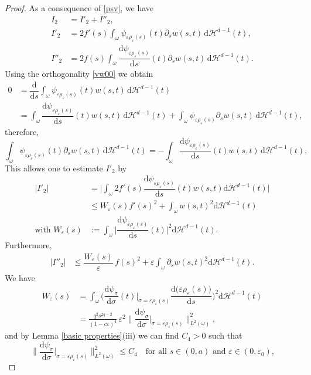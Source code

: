 \documentclass[10pt,a4paper]{amsart}
\newcommand{\dd}{\mathrm{d}}
\newcommand{\eps}{\varepsilon}
\renewcommand{\H}{\mathcal{H}}
\begin{document}
\begin{proof}
As a consequence of \eqref{psv}, we have
\begin{align*}
	I_2&=I'_2+I''_2,\\
	I'_2&=2f'(s)\int_\omega \psi_{\eps \rho_\eps(s)}(t)\partial_s w(s,t)\,\dd\H^{d-1}(t),\\
	I''_2&=2f(s)\int_\omega \dfrac{\dd\psi_{\eps \rho_\eps(s)}}{\dd s}(t)\partial_s w(s,t)\,\dd\H^{d-1}(t).
\end{align*}
Using the orthogonality \eqref{vw00} we obtain
\begin{align*}
0&=\dfrac{\dd }{\dd s} \int_\omega \psi_{\eps \rho_\eps(s)}(t) w(s,t)\,\dd\H^{d-1}(t)\\
&=\int_\omega \dfrac{\dd\psi_{\eps \rho_\eps(s)}}{\dd s}(t) w(s,t)\,\dd\H^{d-1}(t)
+\int_\omega \psi_{\eps \rho_\eps(s)}\partial_s w(s,t)\,\dd\H^{d-1}(t),
\end{align*}
therefore,
\[
\int_\omega \psi_{\eps \rho_\eps(s)}(t)\partial_s w(s,t)\,\dd\H^{d-1}(t)=-\int_\omega 
\dfrac{\dd\psi_{\eps \rho_\eps(s)}}{\dd s}(t)  w(s,t)\,\dd\H^{d-1}(t).
\]
This allows one to estimate $I'_2$ by
\begin{align*}
	|I'_2|&=\bigg|\int_\omega 2f'(s)\dfrac{\dd\psi_{\eps \rho_\eps(s)}}{\dd s}(t) w(s,t)\dd\H^{d-1}(t)\bigg|\\
	&\le
	W_\eps(s) f'(s)^2 +\int_\omega w(s,t)^2\dd\H^{d-1}(t)\\
	\text{with }W_\eps(s)&:=\int_\omega\bigg|\dfrac{\dd\psi_{\eps \rho_\eps(s)}}{\dd s}(t)\bigg|^2\dd\H^{d-1}(t).
\end{align*}
Furthermore,
\begin{align*}
	|I''_2|&\le \dfrac{W_\eps(s)}{\eps}\, f(s)^2+ \eps \int_\omega \partial_s w(s,t)^2\dd\H^{d-1}(t).
\end{align*}	
We have 
\begin{equation*}
	\begin{split}
		W_\eps(s)
		&=\int_{\omega}\bigg(\dfrac{\dd \psi_\sigma}{\dd\sigma}(t)\Big|_{\sigma=\eps\rho_\eps(s)}
		\dfrac{\dd\big(\eps \rho_\eps(s)\big)}{\dd s}\bigg)^2\dd\H^{d-1}(t)
		\\
		&=\frac{q^2s^{2q-2}}{(1-c\eps)^4}\,\eps^2\bigg\|\dfrac{\dd \psi_\sigma}{\dd\sigma}\Big|_{\sigma=\eps\rho_\eps(s)}\bigg\|^2_{L^2(\omega)},
	\end{split}
\end{equation*}
and by Lemma \ref{basic properties}(iii) we can find $C_4>0$ such that
\[
\bigg\|\dfrac{\dd \psi_\sigma}{\dd\sigma}\Big|_{\sigma=\eps\rho_\eps(s)}\bigg\|^2_{L^2(\omega)}\le C_4 \quad\text{for all $s\in(0,a)$ and $\eps\in(0,\eps_0)$,}
\]
\end{proof}
\end{document}
